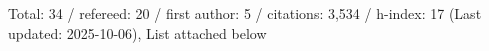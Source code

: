 Total: 34 / refereed: 20 / first author: 5 / citations: 3,534 / h-index: 17 (Last updated: 2025-10-06), List attached below